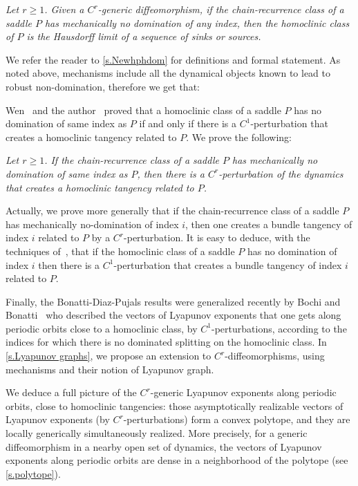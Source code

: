 \documentclass[11pt, a4paper]{amsart}
\theoremstyle{plain}
\theoremstyle{definition}
\theoremstyle{remark}
\numberwithin{equation}{section}         %
\begin{document}
 {\em Let $r\geq 1$. Given a $C^r$-generic diffeomorphism, if the chain-recurrence class of a saddle $P$ has  mechanically no domination of any index, then the homoclinic class of $P$ is the Hausdorff limit of a sequence of sinks or sources.}
\medskip

We refer the reader to \cref{s.Newhphdom} for definitions and formal statement.
As noted above, mechanisms include all the dynamical objects known to lead to robust non-domination, therefore  we get that:
\medskip 

\medskip

Wen~\cite{W} and the author~\cite{G2} proved that a homoclinic class of a saddle $P$ has no domination of same index as $P$  if and only if there is a $C^1$-perturbation that creates a homoclinic tangency related to $P$. We prove the following:
\medskip

 {\em Let $r\geq 1$. If the chain-recurrence class of a saddle $P$ has mechanically no domination of same index as $P$, then there is a $C^r$-perturbation of the dynamics that creates a homoclinic tangency related to $P$.}

\medskip

Actually, we prove more generally that if the chain-recurrence class of a saddle $P$ has mechanically no-domination of index $i$, then one creates a bundle tangency of index $i$ related to $P$ by a $C^r$-perturbation. It is easy to deduce, with the techniques of~\cite{BCDG}, that if the homoclinic class of a saddle $P$ has  no domination of  index  $i$ then there is a $C^1$-perturbation that creates a bundle tangency of index $i$ related to $P$.
\medskip

Finally, the Bonatti-Diaz-Pujals results were generalized recently by Bochi and Bonatti~\cite{BB} who described the vectors of Lyapunov exponents that one gets along periodic orbits close to a homoclinic class, by $C^1$-perturbations, according to the indices for which there is no dominated splitting on the homoclinic class.  
In \cref{s.Lyapunov graphs}, we propose an extension to $C^r$-diffeomorphisms, using  mechanisms and their notion of Lyapunov graph. 

We deduce a full picture of the $C^r$-generic Lyapunov exponents along periodic orbits, close to homoclinic tangencies: those asymptotically realizable vectors of Lyapunov exponents (by $C^r$-perturbations) form a convex polytope, and they are locally generically simultaneously realized. More precisely, for a generic diffeomorphism in a nearby open set of dynamics, the vectors of Lyapunov exponents along periodic orbits are dense in a neighborhood of the polytope (see \cref{s.polytope}).
\end{document}
